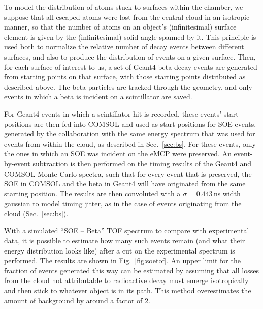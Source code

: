 To model the distribution of atoms stuck to surfaces within the chamber, we suppose that all escaped atoms were lost from the central cloud in an isotropic manner, so that the number of atoms on an object's (infinitesimal) surface element is given by the (infinitesimal) solid angle spanned by it.  This principle is used both to normalize the relative number of decay events between different surfaces, and also to produce the distribution of events on a given surface.  Then, for each surface of interest to us, a set of Geant4 beta decay events are generated from starting points on that surface, with those starting points distributed as described above.  The beta particles are tracked through the geometry, and only events in which a beta is incident on a scintillator are saved.

For Geant4 events in which a scintillator hit is recorded, these events' start positions are then fed into COMSOL and used as start positions for SOE events, generated by the collaboration with the same energy spectrum that was used for events from within the cloud, as described in Sec.~\ref{sec:bs}.  %
For these events, only the ones in which an SOE was incident on the eMCP were preserved.  
An event-by-event subtraction is then performed on the timing results of the Geant4 and COMSOL Monte Carlo spectra, such that for every event that is preserved, the SOE in COMSOL and the beta in Geant4 will have originated from the same starting position.  The results are then convoluted with a $\sigma=0.443\,$ns width gaussian to model timing jitter, as in the case of events originating from the cloud (Sec.~\ref{sec:bs}).  

With a simulated ``SOE -- Beta'' TOF spectrum to compare with experimental data, it is possible to estimate how many such events remain (and what their energy distribution looks like) after a cut on the experimental spectrum is performed. The results are shown in Fig.~\ref{fig:soetof}.  An upper limit for the fraction of events generated this way can be estimated by assuming that all losses from the cloud not attributable to radioactive decay must emerge isotropically and then stick to whatever object is in its path.  This method overestimates the amount of background by around a factor of 2. 


